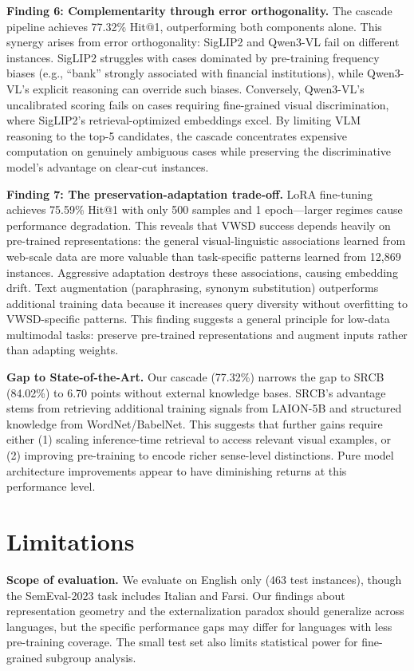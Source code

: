 \documentclass[11pt]{article}
\begin{document}
\textbf{Finding 6: Complementarity through error orthogonality.} The cascade pipeline achieves 77.32\% Hit@1, outperforming both components alone. This synergy arises from error orthogonality: SigLIP2 and Qwen3-VL fail on different instances. SigLIP2 struggles with cases dominated by pre-training frequency biases (e.g., ``bank'' strongly associated with financial institutions), while Qwen3-VL's explicit reasoning can override such biases. Conversely, Qwen3-VL's uncalibrated scoring fails on cases requiring fine-grained visual discrimination, where SigLIP2's retrieval-optimized embeddings excel. By limiting VLM reasoning to the top-5 candidates, the cascade concentrates expensive computation on genuinely ambiguous cases while preserving the discriminative model's advantage on clear-cut instances.

\textbf{Finding 7: The preservation-adaptation trade-off.} LoRA fine-tuning achieves 75.59\% Hit@1 with only 500 samples and 1 epoch---larger regimes cause performance degradation. This reveals that VWSD success depends heavily on pre-trained representations: the general visual-linguistic associations learned from web-scale data are more valuable than task-specific patterns learned from 12,869 instances. Aggressive adaptation destroys these associations, causing embedding drift. Text augmentation (paraphrasing, synonym substitution) outperforms additional training data because it increases query diversity without overfitting to VWSD-specific patterns. This finding suggests a general principle for low-data multimodal tasks: preserve pre-trained representations and augment inputs rather than adapting weights.

\textbf{Gap to State-of-the-Art.} Our cascade (77.32\%) narrows the gap to SRCB (84.02\%) to 6.70 points without external knowledge bases. SRCB's advantage stems from retrieving additional training signals from LAION-5B and structured knowledge from WordNet/BabelNet. This suggests that further gains require either (1) scaling inference-time retrieval to access relevant visual examples, or (2) improving pre-training to encode richer sense-level distinctions. Pure model architecture improvements appear to have diminishing returns at this performance level.

\section{Limitations}
\label{sec:limitations}

\textbf{Scope of evaluation.} We evaluate on English only (463 test instances), though the SemEval-2023 task includes Italian and Farsi. Our findings about representation geometry and the externalization paradox should generalize across languages, but the specific performance gaps may differ for languages with less pre-training coverage. The small test set also limits statistical power for fine-grained subgroup analysis.
\end{document}
